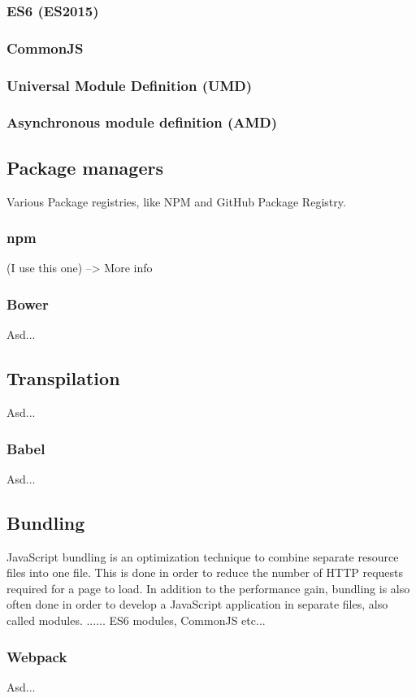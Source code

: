 \subsubsection{ES6 (ES2015)}
\subsubsection{CommonJS}
\subsubsection{Universal Module Definition (UMD)}
\subsubsection{Asynchronous module definition (AMD)}

\subsection{Package managers}
Various Package registries, like NPM and GitHub Package Registry.
\subsubsection{npm}
(I use this one) --> More info
\subsubsection{Bower}
Asd...
\subsection{Transpilation}
Asd...
\subsubsection{Babel}
Asd...
\subsection{Bundling}
JavaScript bundling is an optimization technique to combine separate resource files into one file. This is done in order to reduce the number of HTTP requests required for a page to load. In addition to the performance gain, bundling is also often done in order to develop a JavaScript application in separate files, also called modules. ...... ES6 modules, CommonJS etc...

\subsubsection{Webpack}
Asd...
